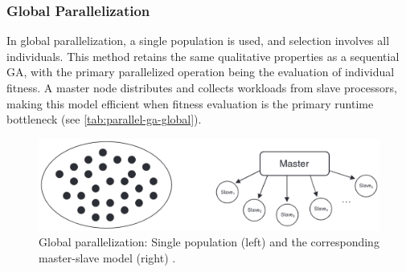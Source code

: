 \documentclass[sigconf]{acmart}
\begin{document}
\subsubsection*{Global Parallelization}
In global parallelization, a single population is used, and selection involves
all individuals. This method retains the same qualitative properties as a
sequential GA, with the primary parallelized operation being the evaluation of
individual fitness. A master node distributes and collects workloads from slave
processors, making this model efficient when fitness evaluation is the primary
runtime bottleneck (see \autoref{tab:parallel-ga-global})\cite{Affenzeller2009}.
\begin{figure}[h]
  \includegraphics[scale=0.22]{assets/parallel-ga-global.png}
  \caption{
    Global parallelization: Single population (left) and the corresponding
    master-slave model (right) \cite{Affenzeller2009}.
  }
  \label{tab:parallel-ga-global}
\end{figure}
\end{document}
